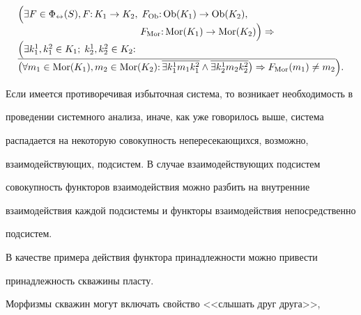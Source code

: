 \[

\begin{array}{l}

 \Big( \exists F\in \Phi_\leftrightarrow (S), F{:}\,K_1 \to K_2,\;

F_{\rm Ob} {:}\,{\rm Ob}(K_1 )\to {\rm Ob}(K_2 ),

\\ \quad\quad\quad\quad \quad\quad \quad\quad \quad\quad \quad\quad  \;\;

F_{\rm Mor} {:}\,{\rm Mor}(K_1)\to {\rm Mor}(K_2 )  \Big)\Rightarrow \\

 \Big(

\exists k_1^1, k_1^2 \in K_1;\; k_2^1, k_2^2 \in K_2 {:}\,

\\

 \overline {

\big(

\forall

m_1 \in {\rm Mor}(K_1),

m_2 \in {\rm Mor}(K_2){:}\,

\overline {\exists k_1^1 m_1 k_1^2 } \wedge

\overline {\exists k_2^1 m_2 k_2^2 }   \big)\Rightarrow F_{\rm Mor}(m_1 )\ne m_2  }\Big).

 \end{array}

\]



Если имеется противоречивая избыточная система, то возникает необходимость в

проведении системного анализа, иначе, как уже говорилось выше, система

распадается на некоторую совокупность непересекающихся, возможно,

взаимодействующих, подсистем. В случае взаимодействующих подсистем

совокупность функторов взаимодействия можно разбить на внутренние

взаимодействия каждой подсистемы и функторы взаимодействия непосредственно

подсистем.



В качестве примера действия функтора принадлежности можно привести

принадлежность скважины пласту.

Морфизмы скважин могут включать свойство <<слышать друг друга>>,

